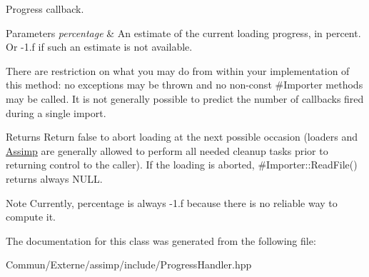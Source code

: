 Progress callback. 


\begin{DoxyParams}{Parameters}
{\em percentage} & An estimate of the current loading progress, in percent. Or -\/1.\+f if such an estimate is not available.\\
\hline
\end{DoxyParams}
There are restriction on what you may do from within your implementation of this method\+: no exceptions may be thrown and no non-\/const \#\+Importer methods may be called. It is not generally possible to predict the number of callbacks fired during a single import.

\begin{DoxyReturn}{Returns}
Return false to abort loading at the next possible occasion (loaders and \hyperlink{namespace_assimp}{Assimp} are generally allowed to perform all needed cleanup tasks prior to returning control to the caller). If the loading is aborted, \#\+Importer\+::\+Read\+File() returns always N\+U\+LL.
\end{DoxyReturn}
\begin{DoxyNote}{Note}
Currently, percentage is always -\/1.\+f because there is no reliable way to compute it. 
\end{DoxyNote}


The documentation for this class was generated from the following file\+:\begin{DoxyCompactItemize}
\item 
Commun/\+Externe/assimp/include/Progress\+Handler.\+hpp\end{DoxyCompactItemize}
